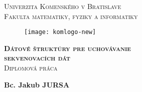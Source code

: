 \thispagestyle{empty}

\begin{center}
    \large{
        \textsc{
            Univerzita Komenského v Bratislave \\
            Fakulta matematiky, fyziky a informatiky
        }
    }
\end{center}

\vspace{2cm}

\begin{figure}[!h]
    \centering
    \texttt{[image: komlogo-new]}
\end{figure}

\vspace{1cm}

\begin{center}
    \LARGE{
        \textbf{
            \textsc{
                Dátové štruktúry pre uchovávanie \\
                sekvenovacích dát \\
            }
        }
    }
    \vspace{1cm}
    \large{
        \textsc{
            Diplomová práca
        }
    }
\end{center}

\vfill

\begin{multicols}{2}
    \begin{flushleft}
        \textbf{\the\year}
    \end{flushleft}
    \begin{flushright}
        \textbf{Bc. Jakub JURSA}
    \end{flushright}
\end{multicols}
